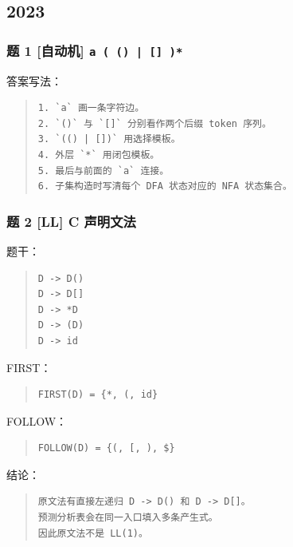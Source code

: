 \documentclass[UTF8,zihao=-4]{ctexart}
\begin{document}
\subsection{2023}


\subsubsection{题 1 [自动机] \texttt{a ( () | [] )*}}


答案写法：


\begin{quote}
\footnotesize
\begin{verbatim}
1. `a` 画一条字符边。
2. `()` 与 `[]` 分别看作两个后缀 token 序列。
3. `(() | [])` 用选择模板。
4. 外层 `*` 用闭包模板。
5. 最后与前面的 `a` 连接。
6. 子集构造时写清每个 DFA 状态对应的 NFA 状态集合。
\end{verbatim}
\end{quote}


\subsubsection{题 2 [LL] C 声明文法}


题干：


\begin{quote}
\footnotesize
\begin{verbatim}
D -> D()
D -> D[]
D -> *D
D -> (D)
D -> id
\end{verbatim}
\end{quote}


FIRST：


\begin{quote}
\footnotesize
\begin{verbatim}
FIRST(D) = {*, (, id}
\end{verbatim}
\end{quote}


FOLLOW：


\begin{quote}
\footnotesize
\begin{verbatim}
FOLLOW(D) = {(, [, ), $}
\end{verbatim}
\end{quote}


结论：


\begin{quote}
\footnotesize
\begin{verbatim}
原文法有直接左递归 D -> D() 和 D -> D[]。
预测分析表会在同一入口填入多条产生式。
因此原文法不是 LL(1)。
\end{verbatim}
\end{quote}
\end{document}
